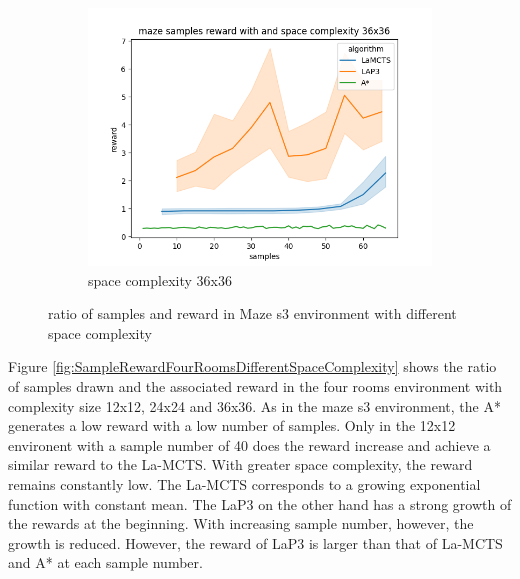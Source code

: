 \documentclass[bibliography=totoc]{scrartcl}
\begin{document}
\begin{figure}[H]
	\begin{subfigure}[b]{0.3\linewidth}
		\includegraphics[width=\linewidth]{img/maze_samples__reward_b_8_LAP3_MCTS_AStar_interrupted_36.png}
        \caption{space complexity 36x36}
	\end{subfigure}
	\caption{ratio of samples and reward in Maze s3 environment with different space complexity}
	\label{fig:SampleRewardMazeDifferentSpaceComplexity}
\end{figure}

Figure \ref{fig:SampleRewardFourRoomsDifferentSpaceComplexity} shows the ratio of samples drawn and the associated reward in the four rooms environment with complexity size 12x12, 24x24 and 36x36.
As in the maze s3 environment, the A* generates a low reward with a low number of samples. 
Only in the 12x12 environent with a sample number of 40 does the reward increase and achieve a similar reward to the \ac{La-MCTS}.
With greater space complexity, the reward remains constantly low.
The \ac{La-MCTS} corresponds to a growing exponential function with constant mean.
The \ac{LaP3} on the other hand has a strong growth of the rewards at the beginning. With increasing sample number, however, the growth is reduced. However, the reward of \ac{LaP3} is larger than that of \ac{La-MCTS} and A* at each sample number.
\end{document}
